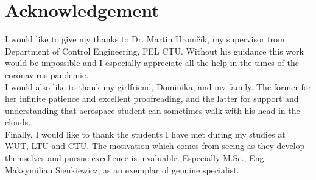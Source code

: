 \hspace{0pt}
\vfill
\section*{Acknowledgement}
I would like to give my thanks to Dr. Martin Hromčík, my supervisor from Department of Control Engineering, FEL CTU. Without his guidance this work would be impossible and I especially appreciate all the help in the times of the coronavirus pandemic.\\[0.07cm]

I would also like to thank my girlfriend, Dominika, and my family. The former for her infinite patience and excellent proofreading, and the latter for support and understanding that aerospace student can sometimes walk with his head in the clouds.\\[0.07cm]

Finally, I would like to thank the students I have met during my studies at WUT, LTU and CTU. The motivation which comes from seeing as they develop themselves and pursue excellence is invaluable. Especially M.Sc., Eng. Maksymilian Sienkiewicz, as an exemplar of genuine specialist.